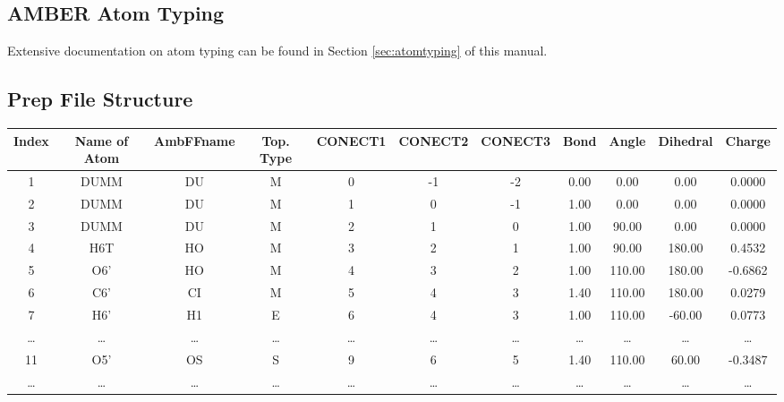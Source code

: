 \documentclass[a4paper]{article}
\begin{document}
\subsection{AMBER Atom Typing}
Extensive documentation on atom typing can be found in Section \ref{sec:atomtyping} of this manual.
\subsection{Prep File Structure}

\footnotesize
\begin{center}
\begin{tabular}{ c c c c c c c c c c c }
\hline
 Index & Name of Atom & AmbFFname & Top. Type &   CONECT1 &   CONECT2 &   CONECT3 &    Bond  &     Angle & Dihedral  &    Charge \\
\hline
 1 &       DUMM   &        DU &        M  &        0  &       -1  &       -2  &    0.00  &     0.00  &     0.00  &    0.0000 \\
 2 &       DUMM   &        DU &        M  &        1  &        0  &       -1  &    1.00  &     0.00  &     0.00  &    0.0000 \\
 3 &       DUMM   &        DU &        M  &        2  &        1  &        0  &    1.00  &    90.00  &     0.00  &    0.0000 \\
 4 &        H6T   &        HO &        M  &        3  &        2  &        1  &    1.00  &    90.00  &   180.00  &    0.4532 \\
 5 &        O6'   &        HO &        M  &        4  &        3  &        2  &    1.00  &   110.00  &   180.00  &   -0.6862 \\
 6 &        C6'   &        CI &        M  &        5  &        4  &        3  &    1.40  &   110.00  &   180.00  &    0.0279 \\
 7 &        H6'   &        H1 &        E  &        6  &        4  &        3  &    1.00  &   110.00  &   -60.00  &    0.0773 \\
 \ldots & \ldots & \ldots & \ldots & \ldots & \ldots & \ldots & \ldots & \ldots & \ldots & \ldots\\
11 &        O5'   &        OS &        S  &        9  &        6  &        5  &    1.40  &   110.00  &    60.00  &   -0.3487 \\
 \ldots & \ldots & \ldots & \ldots & \ldots & \ldots & \ldots & \ldots & \ldots & \ldots & \ldots\\
\hline
\end{tabular}
\end{center}
\footnotesize
\end{document}
